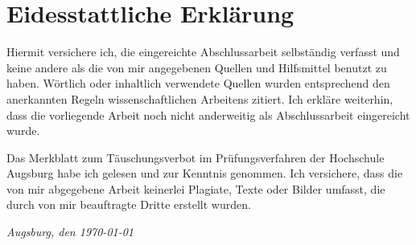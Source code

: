 \newpage
\section*{Eidesstattliche Erklärung}
\thispagestyle{empty}

\vspace{1cm}

Hiermit versichere ich, die eingereichte Abschlussarbeit selbständig verfasst
und keine andere als die von mir angegebenen Quellen und Hilfsmittel benutzt zu
haben. Wörtlich oder inhaltlich verwendete Quellen wurden entsprechend den
anerkannten Regeln wissenschaftlichen Arbeitens zitiert. Ich erkläre weiterhin,
dass die vorliegende Arbeit noch nicht anderweitig als Abschlussarbeit
eingereicht wurde.

Das Merkblatt zum Täuschungsverbot im Prüfungsverfahren der Hochschule Augsburg
habe ich gelesen und zur Kenntnis genommen. Ich versichere, dass die von mir
abgegebene Arbeit keinerlei Plagiate, Texte oder Bilder umfasst, die durch von
mir beauftragte Dritte erstellt wurden.

\vspace{3cm}
\hfill\underline{\hspace{4cm}}

\vspace{0.2cm}
\textit{Augsburg, den \today} \hfill \textit{\ThesisAuthor}
